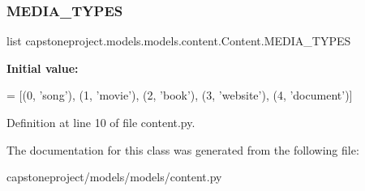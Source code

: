 \subsubsection{\texorpdfstring{M\+E\+D\+I\+A\+\_\+\+T\+Y\+P\+ES}{MEDIA\_TYPES}}
{\footnotesize\ttfamily list capstoneproject.\+models.\+models.\+content.\+Content.\+M\+E\+D\+I\+A\+\_\+\+T\+Y\+P\+ES\hspace{0.3cm}{\ttfamily [static]}}

{\bfseries Initial value\+:}
\begin{DoxyCode}
=  [(0, \textcolor{stringliteral}{'song'}),
                   (1, \textcolor{stringliteral}{'movie'}),
                   (2, \textcolor{stringliteral}{'book'}),
                   (3, \textcolor{stringliteral}{'website'}),
                   (4, \textcolor{stringliteral}{'document'})]
\end{DoxyCode}


Definition at line 10 of file content.\+py.



The documentation for this class was generated from the following file\+:\begin{DoxyCompactItemize}
\item 
capstoneproject/models/models/content.\+py\end{DoxyCompactItemize}
